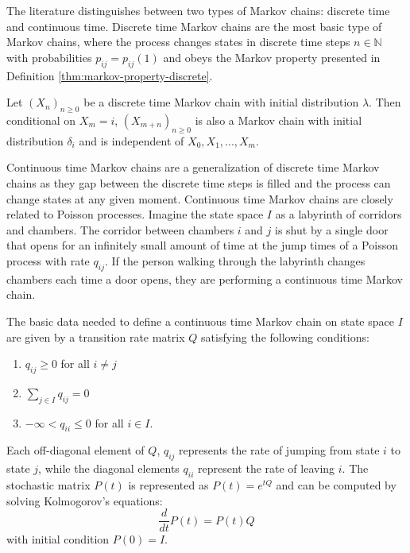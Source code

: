 	The literature distinguishes between two types of Markov chains: discrete time and continuous time.
	Discrete time Markov chains are the most basic type of Markov chains, where the process
	changes states in discrete time steps $n \in \mathbb{N}$ with probabilities $p_{ij} = p_{ij}(1)$
	and obeys the Markov property presented in Definition \ref{thm:markov-property-discrete}.
	
	\begin{defn}
	\label{thm:markov-property-discrete}
	Let $(X_n)_{n \ge 0}$ be a discrete time Markov chain with initial distribution $\lambda$.
	Then conditional on $X_m = i$, $(X_{m + n})_{n \ge 0}$ is also a Markov chain with initial
	distribution $\delta_i$ and is independent of $X_0, X_1, ..., X_m$.
	\end{defn}
	
	Continuous time Markov chains are a generalization of discrete time Markov chains as they
	gap between the discrete time steps is filled and the process can change states at any given moment.
	Continuous time Markov chains are closely related to Poisson processes. Imagine the state
	space $I$ as a labyrinth of corridors and chambers. The corridor between chambers $i$ and $j$
	is shut by a single door that opens for an infinitely small amount of time at the jump times of
	a Poisson process with rate $q_{ij}$. If the person walking through the labyrinth changes
	chambers each time a door opens, they are performing
	a continuous time Markov chain.

	
	The basic data needed to define a continuous time Markov chain on state space $I$ are
	given by a transition rate matrix $Q$ satisfying the following conditions:
	
	\begin{enumerate}
		\item $q_{ij} \ge 0$ for all $i \ne j$
		\item $\sum_{j \in I} q_{ij} = 0$
		\item $-\infty < q_{ii} \le 0$ for all $i \in I$.
	\end{enumerate}
	
	Each off-diagonal element of $Q$, $q_{ij}$ represents the rate of jumping from state $i$ to state $j$,
	while the diagonal elements $q_{ii}$ represent the rate of leaving $i$. The stochastic matrix
	$P(t)$ is represented as $P(t) = e^{tQ}$ and can be computed by solving Kolmogorov's equations:
	\begin{equation}
		\nonumber
		\frac{d}{dt}P(t) = P(t)Q
	\end{equation}
	with initial condition $P(0) = I$.


